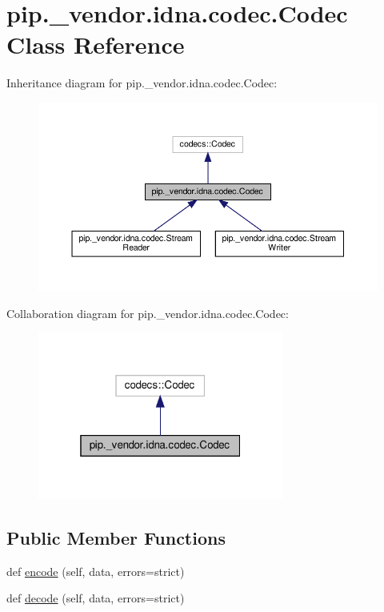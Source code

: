 \hypertarget{classpip_1_1__vendor_1_1idna_1_1codec_1_1Codec}{}\section{pip.\+\_\+vendor.\+idna.\+codec.\+Codec Class Reference}
\label{classpip_1_1__vendor_1_1idna_1_1codec_1_1Codec}


Inheritance diagram for pip.\+\_\+vendor.\+idna.\+codec.\+Codec\+:
\nopagebreak
\begin{figure}[H]
\begin{center}
\leavevmode
\includegraphics[width=350pt]{classpip_1_1__vendor_1_1idna_1_1codec_1_1Codec__inherit__graph}
\end{center}
\end{figure}


Collaboration diagram for pip.\+\_\+vendor.\+idna.\+codec.\+Codec\+:
\nopagebreak
\begin{figure}[H]
\begin{center}
\leavevmode
\includegraphics[width=229pt]{classpip_1_1__vendor_1_1idna_1_1codec_1_1Codec__coll__graph}
\end{center}
\end{figure}
\subsection*{Public Member Functions}
\begin{DoxyCompactItemize}
\item 
def \hyperlink{classpip_1_1__vendor_1_1idna_1_1codec_1_1Codec_ab9b27b3765c83cd9dff0b49370b61c64}{encode} (self, data, errors=\textquotesingle{}strict\textquotesingle{})
\item 
def \hyperlink{classpip_1_1__vendor_1_1idna_1_1codec_1_1Codec_a7567f9eeaeff74ca42779f632b51d205}{decode} (self, data, errors=\textquotesingle{}strict\textquotesingle{})
\end{DoxyCompactItemize}



